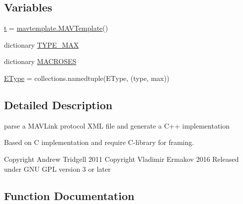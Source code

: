 \subsection*{Variables}
\begin{DoxyCompactItemize}
\item 
\mbox{\hyperlink{namespacepymavlink_1_1generator_1_1mavgen__cpp11_aa444dd03dd243c13577b102c36b91bd9}{t}} = \mbox{\hyperlink{classpymavlink_1_1generator_1_1mavtemplate_1_1MAVTemplate}{mavtemplate.\+M\+A\+V\+Template}}()
\item 
dictionary \mbox{\hyperlink{namespacepymavlink_1_1generator_1_1mavgen__cpp11_a0bb0c7ed11b9127685311115712cb403}{T\+Y\+P\+E\+\_\+\+M\+AX}}
\item 
dictionary \mbox{\hyperlink{namespacepymavlink_1_1generator_1_1mavgen__cpp11_a2944e7367458534a87570bf2f12fed44}{M\+A\+C\+R\+O\+S\+ES}}
\item 
\mbox{\hyperlink{namespacepymavlink_1_1generator_1_1mavgen__cpp11_ab1fba68cbea99714f526b45abbbbf86f}{E\+Type}} = collections.\+namedtuple(\textquotesingle{}E\+Type\textquotesingle{}, (\textquotesingle{}type\textquotesingle{}, \textquotesingle{}max\textquotesingle{}))
\end{DoxyCompactItemize}


\subsection{Detailed Description}
\begin{DoxyVerb}parse a MAVLink protocol XML file and generate a C++ implementation

Based on C implementation and require C-library for framing.

Copyright Andrew Tridgell 2011
Copyright Vladimir Ermakov 2016
Released under GNU GPL version 3 or later
\end{DoxyVerb}
 

\subsection{Function Documentation}
\mbox{\label{namespacepymavlink_1_1generator_1_1mavgen__cpp11_a1780acf401220c5fc94513ec4e40fca4}} 
